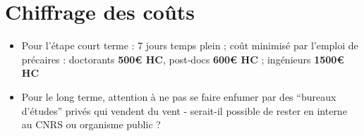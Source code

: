 \documentclass[11pt]{article}
\begin{document}
\section*{Chiffrage des coûts}


\begin{itemize}
\item Pour l'étape court terme : 7 jours temps plein ; coût minimisé par l'emploi de précaires : doctorants \textbf{500\euro{} HC}, post-docs \textbf{600\euro{} HC} ; ingénieurs \textbf{1500\euro{} HC}
\item Pour le long terme, attention à ne pas se faire enfumer par des ``bureaux d'études'' privés qui vendent du vent - serait-il possible de rester en interne au CNRS ou organisme public ?
\end{itemize}












\end{document}
